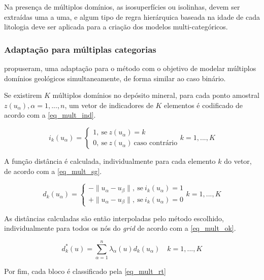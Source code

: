 Na presença de múltiplos domínios, as isosuperfícies ou isolinhas, devem ser extraídas uma a uma, e algum tipo de regra hierárquica baseada na idade de cada litologia deve ser aplicada para a criação dos modelos multi-categóricos.

\subsubsection{Adaptação para múltiplas categorias}

 propuseram, uma adaptação para o método com o objetivo de modelar múltiplos domínios geológicos simultaneamente, de forma similar ao caso binário.

Se existirem $K$ múltiplos domínios no depósito mineral, para cada ponto amostral ${z(u_\alpha),\alpha=1,...,n}$, um vetor de indicadores de $K$ elementos é codificado de acordo com a \autoref{eq_mult_ind}.

\begin{equation}
	i_k(u_\alpha)=\begin{cases}
	1,\:\textrm{se}\:z(u_\alpha)=k\\
    0,\:\textrm{se}\:z(u_\alpha)\:\textrm{caso contrário}\end{cases} k=1,...,K
    \label{eq_mult_ind}
\end{equation}

A função distância é calculada, individualmente para cada elemento $k$ do vetor, de acordo com a \autoref{eq_mult_sg}.

\begin{equation}
	d_k(u_\alpha)=\begin{cases}
	-\parallel u_\alpha-u_\beta\parallel,\:\textrm{se}\:i_k(u_\alpha)=1\\
	+\parallel u_\alpha-u_\beta\parallel,\:\textrm{se}\:i_k(u_\alpha)=0\end{cases} k=1,...,K
    \label{eq_mult_sg}
\end{equation}

As distâncias calculadas são então interpoladas pelo método escolhido, individualmente para todos os nós do \textit{grid} de acordo com a \autoref{eq_mult_ok}.

\begin{equation}
	d_k^*(u)=\sum\limits_{\alpha=1}^n \lambda_\alpha(u)d_k(u_\alpha)\quad k=1,...,K
    \label{eq_mult_ok}
\end{equation}

Por fim, cada bloco é  classificado pela \autoref{eq_mult_rt}

